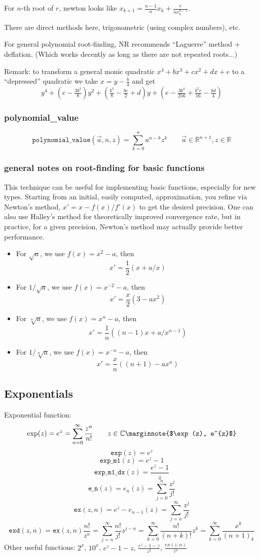 \documentclass[10pt,dvipdfmx,letterpaper,twoside]{article}
\newcommand{\F}[1]{{\mathtt{#1}}}
\newcommand{\RR}{{\mathbb{R}}}
\newcommand{\CC}{{\mathbb{C}}}
\let\DEF=\marginnote
\begin{document}
For $n$-th root of $r$, newton looks like $x_{k+1} = \frac{n-1}{n}x_k + \frac{r}{n x_k^{n-1}}$.

There are direct methods here, trigonometric (using complex numbers), etc.

For general polynomial root-finding, NR recommends ``Laguerre'' method + deflation.  (Which works decently as long as there are not repeated roots...)

Remark: to transform a general monic quadratic $x^4 + bx^3 + cx^2 + dx + e$ to a ``depressed'' quadratic we take $x=y - \tfrac{b}{4}$ and get
\[ y^4 + (c-\tfrac{3b^2}{8})y^2 + (\tfrac{b^3}{8} - \tfrac{bc}{2} + d)y + (e - \tfrac{3b^4}{256} + \tfrac{b^2c}{16} - \tfrac{bd}{4}) \]


\subsubsection{polynomial\_value}
\[ \F{polynomial\_value}(\vec{a},n,z) = \sum_{k=0}^{n}a^{n-k}z^k \qquad \vec{a}\in\RR^{n+1}, z\in\RR \]

\subsubsection{general notes on root-finding for basic functions}
This technique can be useful for implementing basic functions, especially for new types.
Starting from an initial, easily computed, approximation, you refine via Newton's method, $x'=x-f(x)/f'(x)$ to get the desired precision.
One can also use Halley's method for theoretically improved convergence rate, but in practice, for a given precision, Newton's method may
actually provide better performance.
\begin{itemize}
  \item For $\sqrt{a}$, we use $f(x)=x^2-a$, then
    \[ x' = \frac12(x+a/x) \]
  \item For $1/\sqrt{a}$, we use $f(x)=x^{-2}-a$, then
    \[ x' = \frac{x}2(3-a x^2) \]
  \item For $\sqrt[n]{a}$, we use $f(x)=x^n-a$, then
    \[ x' = \frac1n((n-1)x+a/x^{n-1}) \]
  \item For $1/\sqrt[n]{a}$, we use $f(x)=x^{-n}-a$, then
    \[ x' = \frac{x}n((n+1) - a x^n) \]
\end{itemize}


\subsection{Exponentials}
Exponential function:
\[ \exp(z) = e^{z} = \sum_{n=0}^\infty\frac{z^n}{n!} \qquad z\in\CC   \DEF{$\exp(z), e^{z}$}\]
\[ \F{exp}(z) = e^z \]
\[ \F{exp\_m1}(z) = e^z-1 \]
\[ \F{exp\_m1\_dx}(z) = \frac{e^z-1}{z} \]
\[ \F{e\_n}(z) = e_{n}(z) = \sum_{j=0}^n\frac{z^j}{j!} \]
\[ \F{ex}(z,n) = e^z - e_{n-1}(z) = \sum_{j=n}^\infty \frac{z^j}{j!} \]
\[ \F{exd}(z,n) = \F{ex}(z,n)\frac{n!}{z^n} = \sum_{j=n}^\infty\frac{n!}{j!}z^{j-n} = \sum_{k=0}^\infty\frac{n!}{(n+k)!}z^k = \sum_{k=0}^\infty\frac{x^k}{(n+1)_k} \]
Other useful functions: $2^x$, $10^x$, $e^z-1-z$, $\frac{e^z-1-z}{z^2}$, $\frac{ex(z,n)}{z^{n}}$
\end{document}
